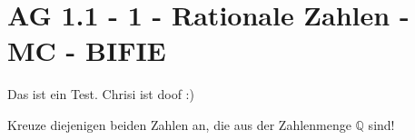 \section{AG 1.1 - 1 - Rationale Zahlen - MC - BIFIE}

\begin{beispiel}[AG 1.1]{1} %
				Das ist ein Test. Chrisi ist doof :)
				
				Kreuze diejenigen beiden Zahlen an, die aus der Zahlenmenge $\mathbb{Q}$ sind!
\end{beispiel}
